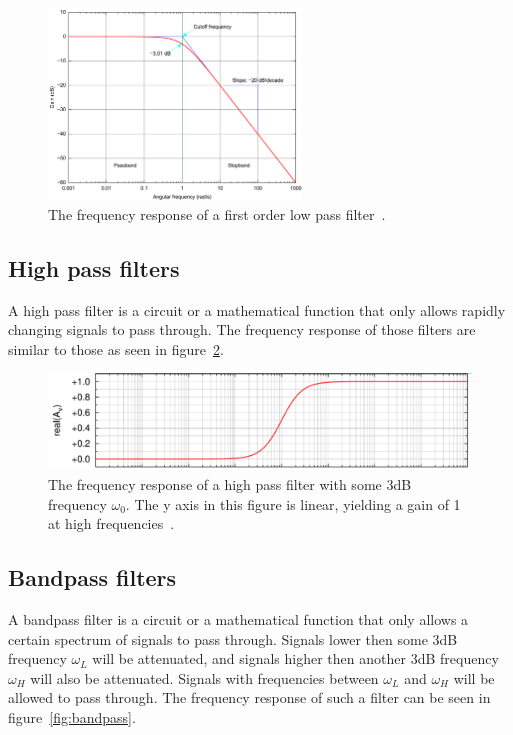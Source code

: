 \documentclass[11pt,a4paper,titlepage]{article}
\begin{document}
	\begin{figure}[h]
		\centering
		\includegraphics[width=0.6\textwidth]{graphics/lowpassbode}
		\caption{The frequency response of a first order low pass filter~\cite{lowpass}.}
		\label{fig:lowpass}
	\end{figure}
	
	
	\subsection{High pass filters}
	A high pass filter is a circuit or a mathematical function that only allows rapidly changing signals to pass through. The frequency response of those filters are similar to those as seen in figure~\ref{fig:highpass}.
	
	\begin{figure}[h]
		\centering
		\includegraphics[width=\textwidth]{graphics/highpassbode}
		\caption{The frequency response of a high pass filter with some 3dB frequency $\omega_0$. The y axis in this figure is linear, yielding a gain of 1 at high frequencies~\cite{highpass}.}
		\label{fig:highpass}
	\end{figure}
	
	
	\subsection{Bandpass filters}
	A bandpass filter is a circuit or a mathematical function that only allows a certain spectrum of signals to pass through. Signals lower then some 3dB frequency $\omega_L$ will be attenuated, and signals higher then another 3dB frequency $\omega_H$ will also be attenuated. Signals with frequencies between $\omega_L$ and $\omega_H$ will be allowed to pass through.
	The frequency response of such a filter can be seen in figure~\ref{fig:bandpass}.
	
\end{document}
